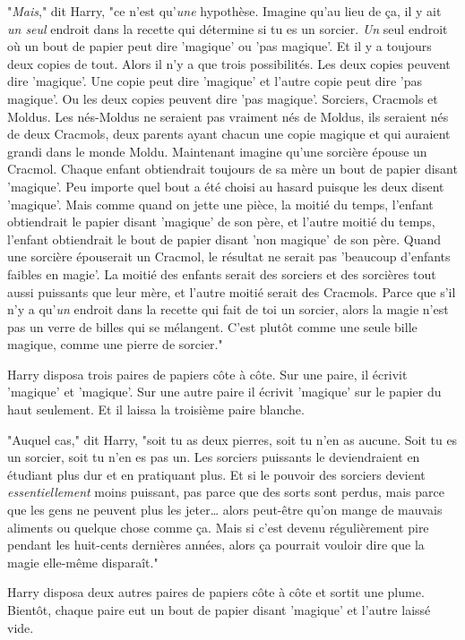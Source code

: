 "\emph{Mais}," dit Harry, "ce n'est qu'\emph{une} hypothèse. Imagine qu'au lieu de ça, il y ait \emph{un seul} endroit dans la recette qui détermine si tu es un sorcier. \emph{Un} seul endroit où un bout de papier peut dire 'magique' ou 'pas magique'. Et il y a toujours deux copies de tout. Alors il n'y a que trois possibilités. Les deux copies peuvent dire 'magique'. Une copie peut dire 'magique' et l'autre copie peut dire 'pas magique'. Ou les deux copies peuvent dire 'pas magique'. Sorciers, Cracmols et Moldus. Les nés-Moldus ne seraient pas vraiment nés de Moldus, ils seraient nés de deux Cracmols, deux parents ayant chacun une copie magique et qui auraient grandi dans le monde Moldu. Maintenant imagine qu'une sorcière épouse un Cracmol. Chaque enfant obtiendrait toujours de sa mère un bout de papier disant 'magique'. Peu importe quel bout a été choisi au hasard puisque les deux disent 'magique'. Mais comme quand on jette une pièce, la moitié du temps, l'enfant obtiendrait le papier disant 'magique' de son père, et l'autre moitié du temps, l'enfant obtiendrait le bout de papier disant 'non magique' de son père. Quand une sorcière épouserait un Cracmol, le résultat ne serait pas 'beaucoup d'enfants faibles en magie'. La moitié des enfants serait des sorciers et des sorcières tout aussi puissants que leur mère, et l'autre moitié serait des Cracmols. Parce que s'il n'y a qu'\emph{un} endroit dans la recette qui fait de toi un sorcier, alors la magie n'est pas un verre de billes qui se mélangent. C'est plutôt comme une seule bille magique, comme une pierre de sorcier."

Harry disposa trois paires de papiers côte à côte. Sur une paire, il écrivit 'magique' et 'magique'. Sur une autre paire il écrivit 'magique' sur le papier du haut seulement. Et il laissa la troisième paire blanche.

"Auquel cas," dit Harry, "soit tu as deux pierres, soit tu n'en as aucune. Soit tu es un sorcier, soit tu n'en es pas un. Les sorciers puissants le deviendraient en étudiant plus dur et en pratiquant plus. Et si le pouvoir des sorciers devient \emph{essentiellement} moins puissant, pas parce que des sorts sont perdus, mais parce que les gens ne peuvent plus les jeter… alors peut-être qu'on mange de mauvais aliments ou quelque chose comme ça. Mais si c'est devenu régulièrement pire pendant les huit-cents dernières années, alors ça pourrait vouloir dire que la magie elle-même disparaît."

Harry disposa deux autres paires de papiers côte à côte et sortit une plume. Bientôt, chaque paire eut un bout de papier disant 'magique' et l'autre laissé vide.

